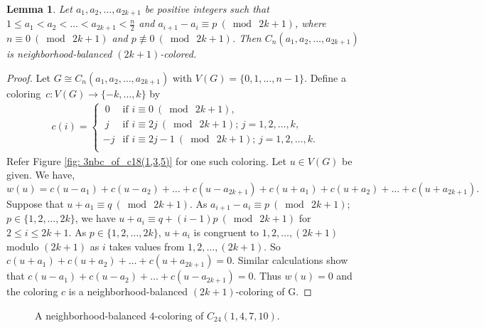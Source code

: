 \documentclass[12pt]{article}
\newtheorem{lemma}[theorem]{Lemma}
\begin{document}
\begin{lemma}\label{circ4k+2}
    Let $a_1, a_2, \dots, a_{2k+1}$ be positive integers such that $1\leq a_1<a_2<\dots < a_{2k+1}<\frac{n}{2}$ and $a_{i+1}-a_{i} \equiv p\ (\bmod\ {2k+1})$, where $n\equiv 0\ (\bmod\ {2k+1})$ and $p \not \equiv 0\ (\bmod\ {2k+1})$.
    Then $C_n(a_1, a_2, \dots, a_{2k+1})$ is neighborhood-balanced $(2k+1)$-colored.
\end{lemma}
\begin{proof}
    Let $G \cong C_n(a_1, a_2, \dots, a_{2k+1})$ with $V(G) = \{0, 1,  \dots, n-1\}$.
    Define a coloring~$c\colon V(G)\rightarrow\{-k, \dots, k\}$ by 
    \begin{align*}
        c(i)=
        \begin{cases}
           \  0 &\text{if $i\equiv 0\ (\bmod\ {2k+1})$,}\\
            \ j &\text{if $i\equiv 2j\ (\bmod\ {2k+1})$; $j=1,2,\dots,k,$}\\
             -j &\text{if $i\equiv 2j-1\ (\bmod\ {2k+1})$; $j=1,2,\dots,k.$}\\
        \end{cases}
    \end{align*}
    Refer Figure \ref{fig: 3nbc_of_c18(1,3,5)} for one such coloring.
    Let $u\in V(G)$ be given. We have, 
    \begin{equation*}
        w(u)=c(u-a_{1})+c(u-a_{2})+\dots+c(u-a_{2k+1})+c(u+a_{1})+c(u+a_{2})+\dots+c(u+a_{2k+1}).
    \end{equation*}
    Suppose that $u+a_1\equiv q\ (\bmod\ {2k+1})$.
    As $a_{i+1}-a_{i}\equiv p\ (\bmod\ {2k+1})$; $p\in \{1,2,\dots,2k\}$, we have $u+a_i\equiv q+(i-1)p\ (\bmod\ {2k+1})$ for $2\leq i \leq 2k+1$.
    As $p\in \{1, 2,  \dots, 2k\}$, $u+a_i$ is congruent to $1, 2, \dots, (2k+1)$ modulo $(2k+1)$ as $i$ takes values from $1, 2,  \dots, (2k+1)$. %
     So $c(u+a_{1})+c(u+a_{2})+\dots+c(u+a_{2k+1})=0$.
     Similar calculations show that $c(u-a_{1})+c(u-a_{2})+\dots+c(u-a_{2k+1})=0$.
     Thus $w(u)=0$ and the coloring $c$ is a neighborhood-balanced $(2k+1)$-coloring of G.
\end{proof}

\begin{figure}[htbp]
\centering

\caption{A neighborhood-balanced $4$-coloring of $C_{24}(1,4,7,10)$.}
\label{fig:4nbc_c24}
\end{figure}
\end{document}

